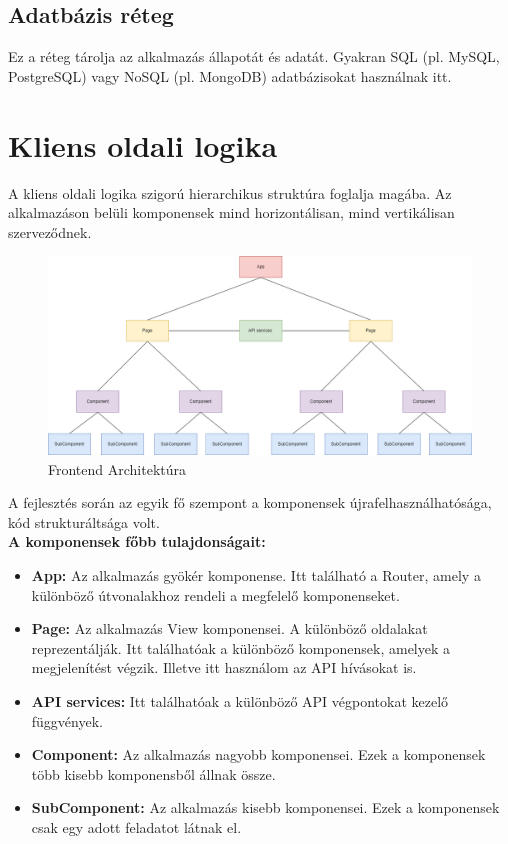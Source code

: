 \subsection*{Adatbázis réteg}
Ez a réteg tárolja az alkalmazás állapotát és adatát. Gyakran SQL (pl. MySQL, PostgreSQL) vagy NoSQL (pl. MongoDB) adatbázisokat használnak itt.

\section*{Kliens oldali logika}
A kliens oldali logika szigorú hierarchikus struktúra foglalja magába. Az alkalmazáson belüli komponensek mind horizontálisan, mind vertikálisan szerveződnek.
\begin{figure}[H]
    \centering
    \includegraphics[width=14.0truecm]{images/Frontend_architecture.png}
    \caption{Frontend Architektúra}
    \label{fig:frontend_architecture}
\end{figure}
A fejlesztés során az egyik fő szempont a komponensek újrafelhasználhatósága, kód strukturáltsága volt.
\\
\textbf{A komponensek főbb tulajdonságait:}
\begin{itemize}
    \item \textbf{App:} Az alkalmazás gyökér komponense. Itt található a Router, amely a különböző útvonalakhoz rendeli a megfelelő komponenseket.
    \item \textbf{Page:} Az alkalmazás View komponensei. A különböző oldalakat reprezentálják. Itt találhatóak a különböző komponensek, amelyek a megjelenítést végzik. Illetve itt használom az API hívásokat is.
    \item \textbf{API services:} Itt találhatóak a különböző API végpontokat kezelő függvények.
    \item \textbf{Component:} Az alkalmazás nagyobb komponensei. Ezek a komponensek több kisebb komponensből állnak össze.
    \item \textbf{SubComponent:} Az alkalmazás kisebb komponensei. Ezek a komponensek csak egy adott feladatot látnak el.
\end{itemize}


